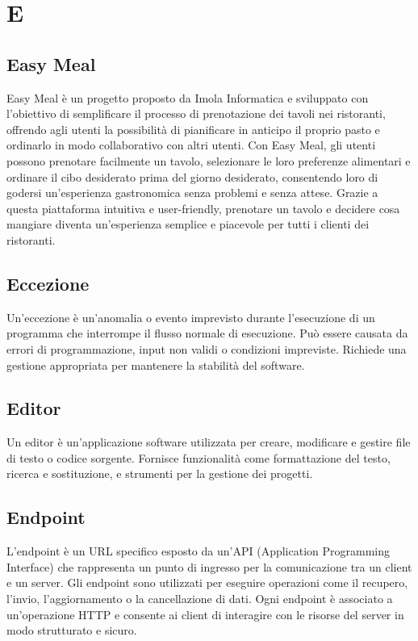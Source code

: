 \section*{E} 
\subsection*{Easy Meal} 
Easy Meal è un progetto proposto da Imola Informatica e sviluppato con l'obiettivo di semplificare il processo di prenotazione dei tavoli nei ristoranti, offrendo agli utenti la possibilità di pianificare in anticipo il proprio pasto e ordinarlo in modo collaborativo con altri utenti. Con Easy Meal, gli utenti possono prenotare facilmente un tavolo, selezionare le loro preferenze alimentari e ordinare il cibo desiderato prima del giorno desiderato, consentendo loro di godersi un'esperienza gastronomica senza problemi e senza attese. Grazie a questa piattaforma intuitiva e user-friendly, prenotare un tavolo e decidere cosa mangiare diventa un'esperienza semplice e piacevole per tutti i clienti dei ristoranti.
\subsection*{Eccezione} 
Un'eccezione è un'anomalia o evento imprevisto durante l'esecuzione di un programma che interrompe il flusso normale di esecuzione. Può essere causata da errori di programmazione, input non validi o condizioni impreviste. Richiede una gestione appropriata per mantenere la stabilità del software.
\subsection*{Editor} 
Un editor è un'applicazione software utilizzata per creare, modificare e gestire file di testo o codice sorgente. Fornisce funzionalità come formattazione del testo, ricerca e sostituzione, e strumenti per la gestione dei progetti.
\subsection*{Endpoint} 
L'endpoint è un URL specifico esposto da un'API (Application Programming Interface) che rappresenta un punto di ingresso per la comunicazione tra un client e un server. Gli endpoint sono utilizzati per eseguire operazioni come il recupero, l'invio, l'aggiornamento o la cancellazione di dati. Ogni endpoint è associato a un'operazione HTTP e consente ai client di interagire con le risorse del server in modo strutturato e sicuro.
